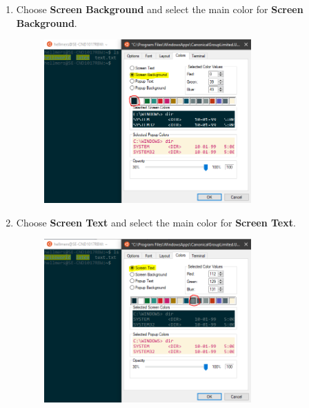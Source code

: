 \begin{enumerate}[a)]
\begin{enumerate}[1.]
        \item Choose \textbf{Screen Background} and select the main color for \textbf{Screen Background}.
        \begin{figure}[H]
            \centering
            \includegraphics[width=0.75\textwidth]{tex/WSL/Ubuntu_terminal_colors/Figures/8.PNG}
        \end{figure}
        
        \item Choose \textbf{Screen Text} and select the main color for \textbf{Screen Text}.
        \begin{figure}[H]
            \centering
            \includegraphics[width=0.75\textwidth]{tex/WSL/Ubuntu_terminal_colors/Figures/9.PNG}
        \end{figure}
        

\end{enumerate}
\end{enumerate}
